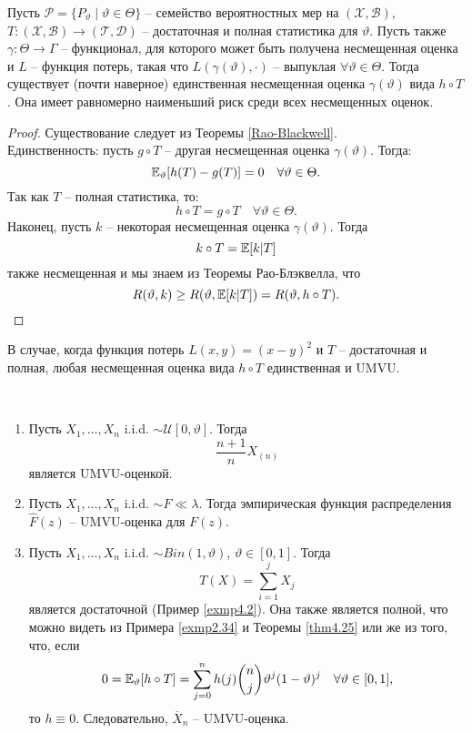 \begin{thm} \label{Lehmann-Scheffe}
	Пусть $\mathcal{P}=\{ P_\vartheta \mid \vartheta \in \Theta \}$ -- семейство вероятностных мер на $(\mathcal{X},\mathcal{B})$, $T\colon(\mathcal{X},\mathcal{B}) \rightarrow (\mathcal{T},\mathcal{D})$ -- достаточная и полная статистика для $\vartheta$. Пусть также $\gamma\colon\Theta \rightarrow \Gamma$ -- функционал, для которого может быть получена несмещенная оценка и $L$ -- функция потерь, такая что $L(\gamma(\vartheta), \cdot)$ -- выпуклая $\forall \vartheta \in \Theta$. Тогда существует (почти наверное) единственная несмещенная оценка $\gamma(\vartheta)$ вида $h \circ T$. Она имеет равномерно наименьший риск среди всех несмещенных оценок.
\end{thm}
\begin{proof}
	Существование следует из Теоремы \ref{Rao-Blackwell}. \\
	Единственность: пусть $g \circ T$ -- другая несмещенная оценка $\gamma(\vartheta)$. Тогда:
	\[ \mathbb{E}_\vartheta[h(T)-g(T)]=0 \quad \forall \vartheta \in \Theta. \]
	Так как $T$ -- полная статистика, то:
	\[ h \circ T = g \circ T \quad \forall \vartheta \in \Theta. \]
	Наконец, пусть $k$ -- некоторая несмещенная оценка $\gamma(\vartheta)$. Тогда
	\[k \circ T = \mathbb{E}[k|T]\]
	также несмещенная и мы знаем из Теоремы Рао-Блэквелла, что
	\[ R(\vartheta, k) \geq R(\vartheta, \mathbb{E}[k|T])=R(\vartheta, h \circ T). \]
\end{proof}

\begin{crlr}
	В случае, когда функция потерь $L(x,y)=(x-y)^2$ и $T$ -- достаточная и полная, любая несмещенная оценка вида $h \circ T$ единственная и UMVU.
\end{crlr}

\begin{exmp} \label{exmp4.30} \
	\begin{enumerate}
		\item Пусть $X_1, \dots, X_n$ i.i.d. $\sim \mathcal{U}[0,\vartheta]$. Тогда
		\[ \frac{n+1}{n}X_{(n)} \]
		является UMVU-оценкой.
		\item Пусть $X_1, \dots, X_n$ i.i.d. $\sim F \ll \lambda$. Тогда эмпирическая функция распределения $\hat{F}(z)$ -- UMVU-оценка для $F(z)$.
		\item Пусть $X_1, \dots, X_n$ i.i.d. $\sim Bin(1,\vartheta)$, $\vartheta \in [0, 1]$. Тогда
		\[ T(X)=\sum_{i=1}^{j}X_j \]
		является достаточной (Пример \ref{exmp4.2}). Она также является полной, что можно видеть из Примера \ref{exmp2.34} и Теоремы \ref{thm4.25} или же из того, что, если
		\[ 0 = \mathbb{E}_\vartheta[h \circ T]=\sum_{j=0}^{n}h(j)\binom{n}{j}\vartheta^j(1-\vartheta)^j \quad \forall \vartheta \in [0, 1], \]
		то $h \equiv 0$. Следовательно, $\overline{X}_n$ -- UMVU-оценка.
	\end{enumerate}
\end{exmp}

